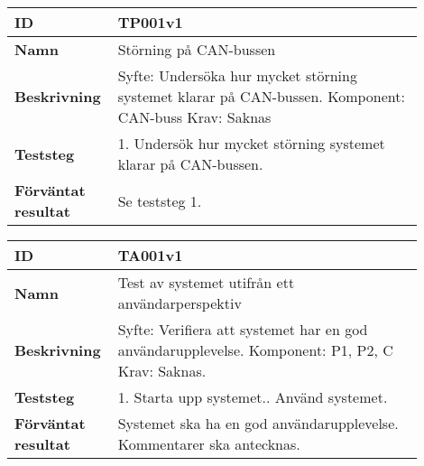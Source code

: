 \begin{table}[h!]
\begin{tabular}{| p{0.18\linewidth} | p{0.72\linewidth} |}
\hline
\textbf{ID} & TP001v1 \\ \hline
\textbf{Namn} & 
Störning på CAN-bussen
\\ \hline
\textbf{Beskrivning} &
Syfte: Undersöka hur mycket störning systemet klarar på CAN-bussen.\newline
Komponent: CAN-buss\newline
Krav: Saknas
\\ \hline
\textbf{Teststeg} &
1. Undersök hur mycket störning systemet klarar på CAN-bussen.
\\ \hline
\textbf{Förväntat resultat} & Se teststeg 1.
\\ \hline
\end{tabular}
\end{table}

\begin{table}[h!]
\begin{tabular}{| p{0.18\linewidth} | p{0.72\linewidth} |}
\hline
\textbf{ID} & TA001v1 \\ \hline
\textbf{Namn} & 
Test av systemet utifrån ett användarperspektiv
\\ \hline
\textbf{Beskrivning} &
Syfte: Verifiera att systemet har en god användarupplevelse.\newline
Komponent: P1, P2, C\newline
Krav: Saknas.
\\ \hline
\textbf{Teststeg} &
1. Starta upp systemet.\newline
2. Använd systemet.
\\ \hline
\textbf{Förväntat resultat} & Systemet ska ha en god användarupplevelse.
Kommentarer ska antecknas.
\\ \hline
\end{tabular}
\end{table}

\newpage

